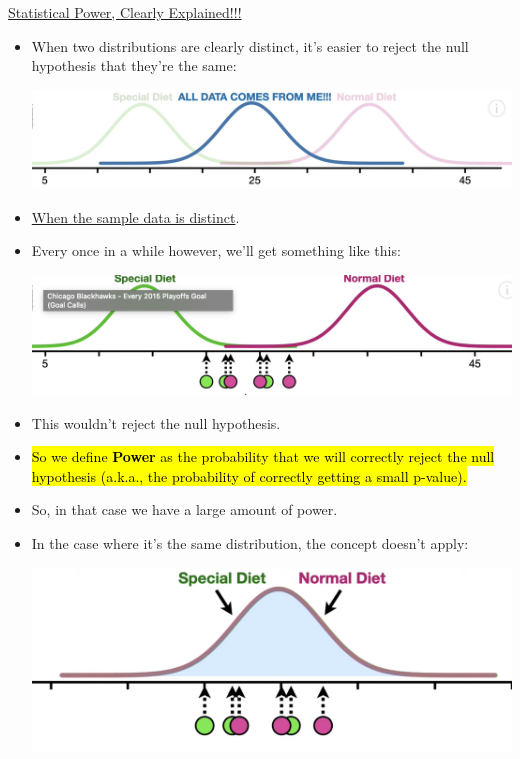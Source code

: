 \documentclass[12pt, titlepage, french]{report}
\begin{document}
\begin{YTB_SUMM_AUTO_NUMB}[label = {SQ-P-statpower}]{\href{https://www.youtube.com/watch?v=Rsc5znwR5FA&feature=youtu.be}{Statistical Power, Clearly Explained!!!}}
\begin{itemize}[leftmargin = *]
	\item	When two distributions are clearly distinct, it's easier to reject the null hypothesis that they're the same:
		\begin{center}
		\includegraphics[scale=0.4]{src/SQ-P-SP.png}
		\end{center}
	\item	\underline{When the sample data is distinct}.
	\item	Every once in a while however, we'll get something like this:
		\begin{center}
		\includegraphics[scale=0.4]{src/SQ-P-SP-2.png}
		\end{center}
	\item	This wouldn't reject the null hypothesis.
	\item	\hl{So we define \textbf{Power} as the probability that we will correctly reject the null hypothesis (a.k.a., the probability of correctly getting a small p-value).}
	\item	So, in that case we have a large amount of power.
	\item	In the case where it's the same distribution, the concept doesn't apply:
		\begin{center}
		\includegraphics[scale=0.4]{src/SQ-P-SP-3.png}

\end{center}
\end{itemize}
\end{YTB_SUMM_AUTO_NUMB}
\end{document}
